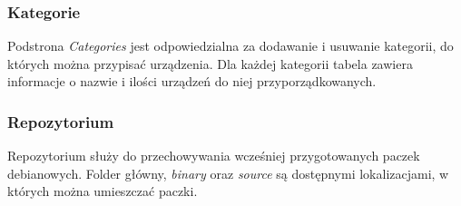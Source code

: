 \documentclass[polish,12pt]{aghthesis}
\begin{document}
\centerline{
}

\subsubsection{Kategorie}
Podstrona \emph{Categories} jest odpowiedzialna za dodawanie i usuwanie kategorii, do których można przypisać urządzenia. Dla każdej kategorii tabela zawiera informacje o nazwie i ilości urządzeń do niej przyporządkowanych.

\centerline{
}

\subsubsection{Repozytorium}
Repozytorium służy do przechowywania wcześniej przygotowanych paczek debianowych. Folder główny, \emph{binary} oraz \emph{source} są dostępnymi lokalizacjami, w których można umieszczać paczki.
\end{document}
